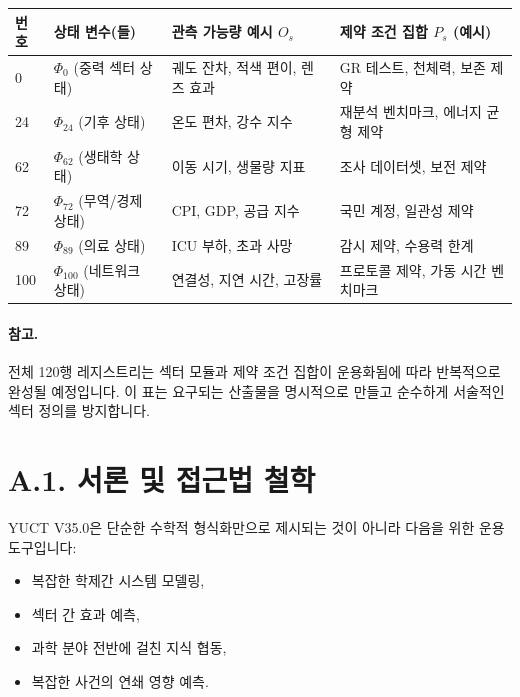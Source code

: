 \documentclass[13pt,a4paper]{article}
\begin{document}
	\begin{longtable}{|p{0.8cm}|p{4.2cm}|p{4.5cm}|p{4.7cm}|}
		\hline
		\textbf{번호} & \textbf{상태 변수(들)} & \textbf{관측 가능량 예시 $O_s$} & \textbf{제약 조건 집합 $P_s$ (예시)} \\
		\hline
		\endhead
		0 & $\Phi_0$ (중력 섹터 상태) & 궤도 잔차, 적색 편이, 렌즈 효과 & GR 테스트, 천체력, 보존 제약 \\
		\hline
		24 & $\Phi_{24}$ (기후 상태) & 온도 편차, 강수 지수 & 재분석 벤치마크, 에너지 균형 제약 \\
		\hline
		62 & $\Phi_{62}$ (생태학 상태) & 이동 시기, 생물량 지표 & 조사 데이터셋, 보전 제약 \\
		\hline
		72 & $\Phi_{72}$ (무역/경제 상태) & CPI, GDP, 공급 지수 & 국민 계정, 일관성 제약 \\
		\hline
		89 & $\Phi_{89}$ (의료 상태) & ICU 부하, 초과 사망 & 감시 제약, 수용력 한계 \\
		\hline
		100 & $\Phi_{100}$ (네트워크 상태) & 연결성, 지연 시간, 고장률 & 프로토콜 제약, 가동 시간 벤치마크 \\
		\hline
	\end{longtable}
	
	\paragraph{참고.}
	전체 120행 레지스트리는 섹터 모듈과 제약 조건 집합이 운용화됨에 따라 반복적으로 완성될 예정입니다. 이 표는 요구되는 산출물을 명시적으로 만들고 순수하게 서술적인 섹터 정의를 방지합니다.
	
	\section*{A.1. 서론 및 접근법 철학}
	
	YUCT V35.0은 단순한 수학적 형식화만으로 제시되는 것이 아니라 다음을 위한 운용 도구입니다:
	\begin{itemize}[leftmargin=*]
		\item 복잡한 학제간 시스템 모델링,
		\item 섹터 간 효과 예측,
		\item 과학 분야 전반에 걸친 지식 협동,
		\item 복잡한 사건의 연쇄 영향 예측.
	\end{itemize}
\end{document}
